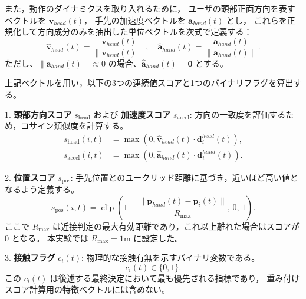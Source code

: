 \documentclass[../../main.tex]{subfiles} %
\begin{document}
また，動作のダイナミクスを取り入れるために，
ユーザの頭部正面方向を表すベクトルを $\mathbf{v}_{head}(t)$，
手先の加速度ベクトルを $\mathbf{a}_{hand}(t)$ とし，
これらを正規化して方向成分のみを抽出した単位ベクトルを次式で定義する：
\begin{equation}
\hat{\mathbf{v}}_{head}(t) = \frac{\mathbf{v}_{head}(t)}{\|\mathbf{v}_{head}(t)\|}, \quad
\hat{\mathbf{a}}_{hand}(t) = \frac{\mathbf{a}_{hand}(t)}{\|\mathbf{a}_{hand}(t)\|}.
\end{equation}
ただし、$\|\mathbf{a}_{hand}(t)\| \approx 0$ の場合、$\hat{\mathbf{a}}_{hand}(t) = \mathbf{0}$ とする。


上記ベクトルを用い，以下の3つの連続値スコアと1つのバイナリフラグを算出する。

1. \textbf{頭部方向スコア} $s_{\text{head}}$ および \textbf{加速度スコア} $s_{\text{accel}}$:
方向の一致度を評価するため，コサイン類似度を計算する。
\begin{align}
s_{\text{head}}(i,t) &= \max \left(0, \hat{\mathbf{v}}_{head}(t)\cdot \mathbf{d}_i^{head}(t)\right), \\
s_{\text{accel}}(i,t) &= \max \left(0, \hat{\mathbf{a}}_{hand}(t)\cdot \mathbf{d}_i^{hand}(t)\right).
\end{align}

2. \textbf{位置スコア} $s_{\text{pos}}$:
手先位置とのユークリッド距離に基づき，近いほど高い値となるよう定義する。
\begin{equation}
s_{\text{pos}}(i,t) = \operatorname{clip}\left(1 - \frac{\|\mathbf{p}_{hand}(t)-\mathbf{p}_i(t)\|}{R_{\max}},\,0,\,1\right).
\end{equation}
ここで $R_{\max}$ は近接判定の最大有効距離であり，これ以上離れた場合はスコアが 0 となる。
本実験では $R_{\max}=1 \mathrm{m}$ に設定した。


3. \textbf{接触フラグ} $c_i(t)$:
物理的な接触有無を示すバイナリ変数である。
\begin{equation}
c_i(t) \in \{0,1\}.
\end{equation}
この $c_i(t)$ は後述する最終決定において最も優先される指標であり，
重み付けスコア計算用の特徴ベクトルには含めない。
\end{document}
